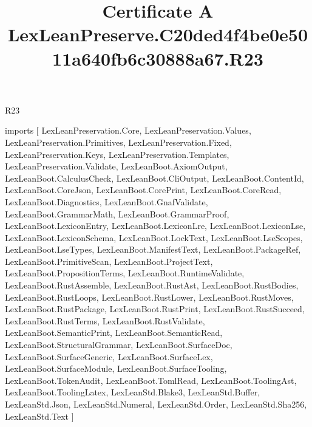 \begin{lexlean}{R23}
\title{Certificate A LexLeanPreserve.C20ded4f4be0e5011a640fb6c30888a67.R23}
\begin{coremodule}
imports [
  LexLeanPreservation.Core,
  LexLeanPreservation.Values,
  LexLeanPreservation.Primitives,
  LexLeanPreservation.Fixed,
  LexLeanPreservation.Keys,
  LexLeanPreservation.Templates,
  LexLeanPreservation.Validate,
  LexLeanBoot.AxiomOutput,
  LexLeanBoot.CalculusCheck,
  LexLeanBoot.CliOutput,
  LexLeanBoot.ContentId,
  LexLeanBoot.CoreJson,
  LexLeanBoot.CorePrint,
  LexLeanBoot.CoreRead,
  LexLeanBoot.Diagnostics,
  LexLeanBoot.GnafValidate,
  LexLeanBoot.GrammarMath,
  LexLeanBoot.GrammarProof,
  LexLeanBoot.LexiconEntry,
  LexLeanBoot.LexiconLre,
  LexLeanBoot.LexiconLse,
  LexLeanBoot.LexiconSchema,
  LexLeanBoot.LockText,
  LexLeanBoot.LseScopes,
  LexLeanBoot.LseTypes,
  LexLeanBoot.ManifestText,
  LexLeanBoot.PackageRef,
  LexLeanBoot.PrimitiveScan,
  LexLeanBoot.ProjectText,
  LexLeanBoot.PropositionTerms,
  LexLeanBoot.RuntimeValidate,
  LexLeanBoot.RustAssemble,
  LexLeanBoot.RustAst,
  LexLeanBoot.RustBodies,
  LexLeanBoot.RustLoops,
  LexLeanBoot.RustLower,
  LexLeanBoot.RustMoves,
  LexLeanBoot.RustPackage,
  LexLeanBoot.RustPrint,
  LexLeanBoot.RustSucceed,
  LexLeanBoot.RustTerms,
  LexLeanBoot.RustValidate,
  LexLeanBoot.SemanticPrint,
  LexLeanBoot.SemanticRead,
  LexLeanBoot.StructuralGrammar,
  LexLeanBoot.SurfaceDoc,
  LexLeanBoot.SurfaceGeneric,
  LexLeanBoot.SurfaceLex,
  LexLeanBoot.SurfaceModule,
  LexLeanBoot.SurfaceTooling,
  LexLeanBoot.TokenAudit,
  LexLeanBoot.TomlRead,
  LexLeanBoot.ToolingAst,
  LexLeanBoot.ToolingLatex,
  LexLeanStd.Blake3,
  LexLeanStd.Buffer,
  LexLeanStd.Json,
  LexLeanStd.Numeral,
  LexLeanStd.Order,
  LexLeanStd.Sha256,
  LexLeanStd.Text
]


\end{coremodule}
\end{lexlean}
